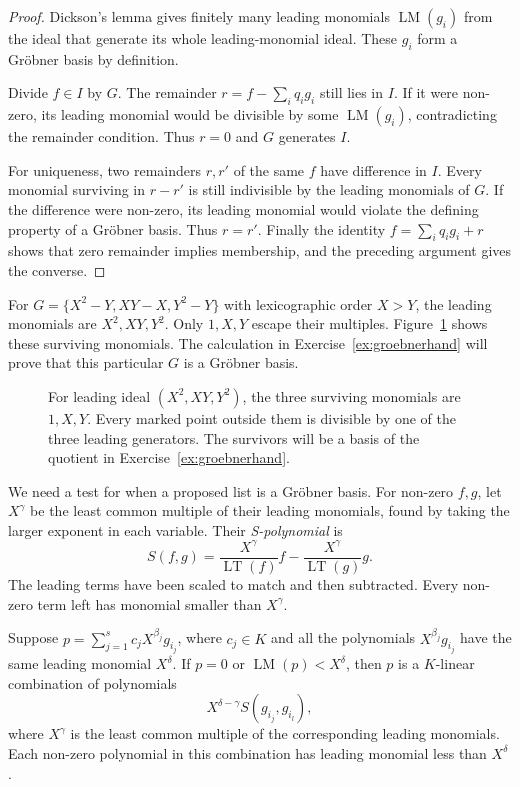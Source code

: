 \begin{proof}
Dickson's lemma gives finitely many leading monomials $\operatorname{LM}(g_i)$ from the ideal that generate its whole leading-monomial ideal. These $g_i$ form a Gröbner basis by definition.

Divide $f\in I$ by $G$. The remainder $r=f-\sum_iq_ig_i$ still lies in $I$. If it were non-zero, its leading monomial would be divisible by some $\operatorname{LM}(g_i)$, contradicting the remainder condition. Thus $r=0$ and $G$ generates $I$.

For uniqueness, two remainders $r,r'$ of the same $f$ have difference in $I$. Every monomial surviving in $r-r'$ is still indivisible by the leading monomials of $G$. If the difference were non-zero, its leading monomial would violate the defining property of a Gröbner basis. Thus $r=r'$. Finally the identity $f=\sum_iq_ig_i+r$ shows that zero remainder implies membership, and the preceding argument gives the converse.
\end{proof}

For $G=\{X^2-Y,XY-X,Y^2-Y\}$ with lexicographic order $X>Y$, the leading monomials are $X^2,XY,Y^2$. Only $1,X,Y$ escape their multiples. Figure~\ref{fig:v10new-ch04-staircase} shows these surviving monomials. The calculation in Exercise~\ref{ex:groebnerhand} will prove that this particular $G$ is a Gröbner basis.

\begin{figure}[ht]
\centering
{}
\caption{For leading ideal $(X^2,XY,Y^2)$, the three surviving monomials are $1,X,Y$. Every marked point outside them is divisible by one of the three leading generators. The survivors will be a basis of the quotient in Exercise~\ref{ex:groebnerhand}.}
\label{fig:v10new-ch04-staircase}
\end{figure}

We need a test for when a proposed list is a Gröbner basis. For non-zero $f,g$, let $X^\gamma$ be the least common multiple of their leading monomials, found by taking the larger exponent in each variable. Their \emph{S-polynomial} is
\[
S(f,g)=\frac{X^\gamma}{\operatorname{LT}(f)}f
-\frac{X^\gamma}{\operatorname{LT}(g)}g.
\]
The leading terms have been scaled to match and then subtracted. Every non-zero term left has monomial smaller than $X^\gamma$.

\begin{lemma}\label{lem:cancel}
Suppose $p=\sum_{j=1}^s c_jX^{\beta_j}g_{i_j}$, where $c_j\in K$ and all the polynomials $X^{\beta_j}g_{i_j}$ have the same leading monomial $X^\delta$. If $p=0$ or $\operatorname{LM}(p)<X^\delta$, then $p$ is a $K$-linear combination of polynomials
\[
X^{\delta-\gamma}S(g_{i_j},g_{i_l}),
\]
where $X^\gamma$ is the least common multiple of the corresponding leading monomials. Each non-zero polynomial in this combination has leading monomial less than $X^\delta$.
\end{lemma}

